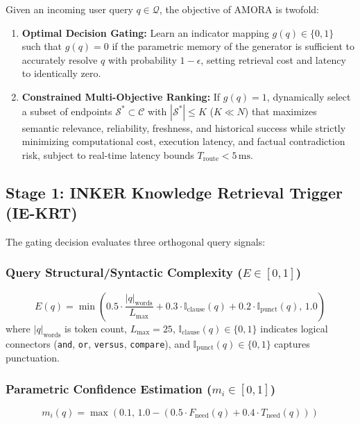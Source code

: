 \documentclass[journal,10pt,twocolumn]{IEEEtran}
\begin{document}
Given an incoming user query $q \in \mathcal{Q}$, the objective of AMORA is twofold:
\begin{enumerate}
    \item \textbf{Optimal Decision Gating:} Learn an indicator mapping $g(q) \in \{0, 1\}$ such that $g(q) = 0$ if the parametric memory of the generator is sufficient to accurately resolve $q$ with probability $1 - \epsilon$, setting retrieval cost and latency to identically zero.
    \item \textbf{Constrained Multi-Objective Ranking:} If $g(q) = 1$, dynamically select a subset of endpoints $\mathcal{S}^* \subset \mathcal{C}$ with $|\mathcal{S}^*| \le K$ ($K \ll N$) that maximizes semantic relevance, reliability, freshness, and historical success while strictly minimizing computational cost, execution latency, and factual contradiction risk, subject to real-time latency bounds $T_{\text{route}} < 5\,\text{ms}$.
\end{enumerate}

\subsection{Stage 1: INKER Knowledge Retrieval Trigger (IE-KRT)}
The gating decision evaluates three orthogonal query signals:

\subsubsection{Query Structural/Syntactic Complexity ($E \in [0, 1]$)}
\begin{equation}
    E(q) = \min\left( 0.5 \cdot \frac{|q|_{\text{words}}}{L_{\text{max}}} + 0.3 \cdot \mathbb{I}_{\text{clause}}(q) + 0.2 \cdot \mathbb{I}_{\text{punct}}(q), \, 1.0 \right)
    \label{eq:complexity_e}
\end{equation}
where $|q|_{\text{words}}$ is token count, $L_{\text{max}} = 25$, $\mathbb{I}_{\text{clause}}(q) \in \{0, 1\}$ indicates logical connectors (\texttt{and}, \texttt{or}, \texttt{versus}, \texttt{compare}), and $\mathbb{I}_{\text{punct}}(q) \in \{0, 1\}$ captures punctuation.

\subsubsection{Parametric Confidence Estimation ($m_i \in [0, 1]$)}
\begin{equation}
    m_i(q) = \max\left( 0.1, \, 1.0 - \left( 0.5 \cdot F_{\text{need}}(q) + 0.4 \cdot T_{\text{need}}(q) \right) \right)
    \label{eq:confidence_m}
\end{equation}
\end{document}
